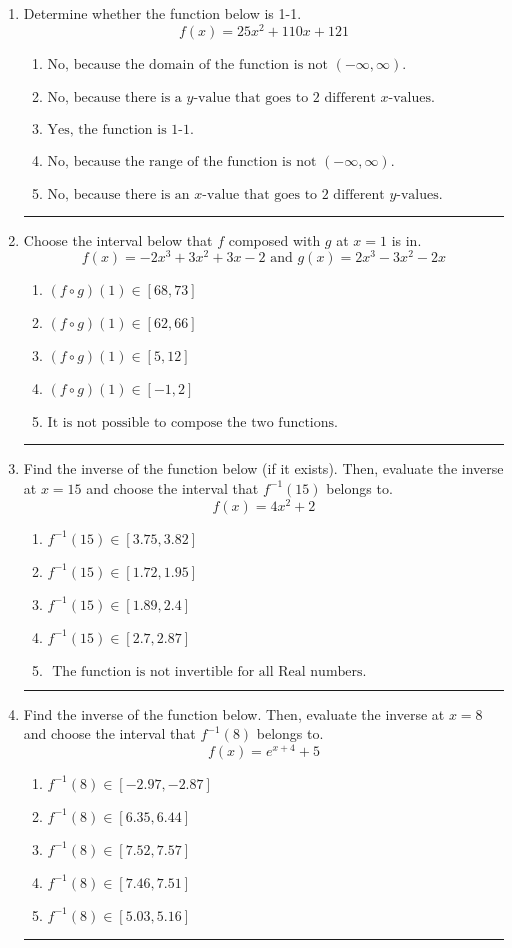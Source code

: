 \documentclass[14pt]{extbook}
\newcommand{\litem}[1]{\item#1\hspace*{-1cm}\rule{\textwidth}{0.4pt}}
\begin{document}
\begin{enumerate}
{\begin{enumerate}[label=\Alph*.]
\end{enumerate} }
\litem{
Determine whether the function below is 1-1.\[ f(x) = 25 x^2 + 110 x + 121 \]\begin{enumerate}[label=\Alph*.]
\item \( \text{No, because the domain of the function is not $(-\infty, \infty)$.} \)
\item \( \text{No, because there is a $y$-value that goes to 2 different $x$-values.} \)
\item \( \text{Yes, the function is 1-1.} \)
\item \( \text{No, because the range of the function is not $(-\infty, \infty)$.} \)
\item \( \text{No, because there is an $x$-value that goes to 2 different $y$-values.} \)

\end{enumerate} }
\litem{
Choose the interval below that $f$ composed with $g$ at $x=1$ is in.\[ f(x) = -2x^{3} +3 x^{2} +3 x -2 \text{ and } g(x) = 2x^{3} -3 x^{2} -2 x \]\begin{enumerate}[label=\Alph*.]
\item \( (f \circ g)(1) \in [68, 73] \)
\item \( (f \circ g)(1) \in [62, 66] \)
\item \( (f \circ g)(1) \in [5, 12] \)
\item \( (f \circ g)(1) \in [-1, 2] \)
\item \( \text{It is not possible to compose the two functions.} \)

\end{enumerate} }
\litem{
Find the inverse of the function below (if it exists). Then, evaluate the inverse at $x = 15$ and choose the interval that $f^{-1}(15)$ belongs to.\[ f(x) = 4 x^2 + 2 \]\begin{enumerate}[label=\Alph*.]
\item \( f^{-1}(15) \in [3.75, 3.82] \)
\item \( f^{-1}(15) \in [1.72, 1.95] \)
\item \( f^{-1}(15) \in [1.89, 2.4] \)
\item \( f^{-1}(15) \in [2.7, 2.87] \)
\item \( \text{ The function is not invertible for all Real numbers. } \)

\end{enumerate} }
\litem{
Find the inverse of the function below. Then, evaluate the inverse at $x = 8$ and choose the interval that $f^{-1}(8)$ belongs to.\[ f(x) = e^{x+4}+5 \]\begin{enumerate}[label=\Alph*.]
\item \( f^{-1}(8) \in [-2.97, -2.87] \)
\item \( f^{-1}(8) \in [6.35, 6.44] \)
\item \( f^{-1}(8) \in [7.52, 7.57] \)
\item \( f^{-1}(8) \in [7.46, 7.51] \)
\item \( f^{-1}(8) \in [5.03, 5.16] \)


\end{enumerate}}
\end{enumerate}
\end{document}
